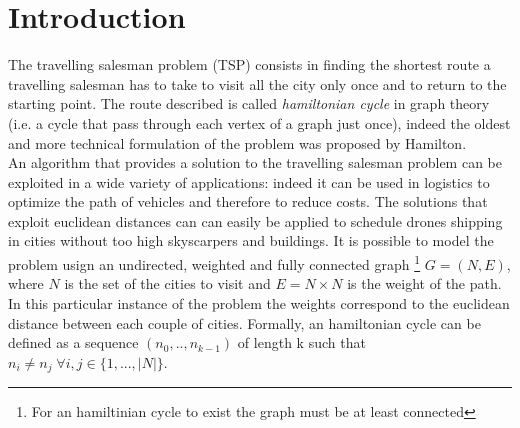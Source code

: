 \documentclass{article}
\begin{document}
\section{Introduction}
The travelling salesman problem (TSP) consists in finding the shortest route a travelling salesman has to take to visit all the city only once and to return to the starting point. The route described is called \textit{hamiltonian cycle} in graph theory (i.e. a cycle that pass through each vertex of a graph just once), indeed the oldest and more technical formulation of the problem was proposed by Hamilton. \\
An algorithm that provides a solution to the travelling salesman problem can be exploited in a wide variety of applications: indeed it can be used in logistics to optimize the path of vehicles and therefore to reduce costs. The solutions that exploit euclidean distances can can easily be applied to schedule drones shipping in cities without too high skyscarpers and buildings.
It is possible to model the problem usign an undirected, weighted and fully connected graph \footnote{For an hamiltinian cycle to exist the graph must be at least connected} $G = (N,E)$, where $N$ is the set of the cities to visit and $E =  N \times N$ is the weight of the path. In this particular instance of the problem the weights correspond to the euclidean distance between each couple of cities.
Formally, an hamiltonian cycle can be defined as a sequence $(n_0, .., n_{k-1})$ of length k such that $n_i \neq n_j \; \forall i,j \in \{1,..., |N|\}$. \\
\end{document}
